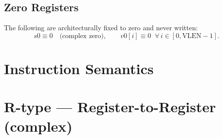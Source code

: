 \documentclass[10pt]{article}
\begin{document}
\subsection*{Zero Registers}
\noindent The following are architecturally fixed to zero and never written:
\[
s0 \equiv 0\quad\text{(complex zero)}, \qquad
v0[i] \equiv 0\;\; \forall\, i \in [0,\mathrm{VLEN}-1].
\]

\clearpage
\section*{Instruction Semantics}

\section*{R-type — Register-to-Register (complex)}

\end{document}
